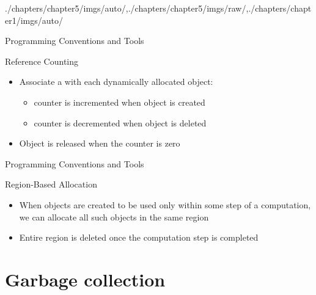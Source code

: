 \begin{graphicspathcontext}{{./chapters/chapter5/imgs/auto/},{./chapters/chapter5/imgs/raw/},{./chapters/chapter1/imgs/auto/}}
\begin{bibunit}[apalike]
\begin{frame}[t]{{Programming Conventions} and Tools \insertcontinuationtext}
	\begin{block}{Reference Counting}
		\begin{itemize}
			\item Associate a  with each dynamically allocated object: \begin{itemize}
				\item counter is incremented when object is created
				\item counter is decremented when object is deleted
			\end{itemize}
			\item Object is released when the counter is zero
		\end{itemize}
	\end{block}
	\vspace{.25cm}
\end{frame}

\begin{frame}{Programming Conventions and Tools \insertcontinuationtext}
	\begin{block}{Region-Based Allocation}
		\begin{itemize}
			\item When objects are created to be used only within some step of a computation, we can allocate all such objects in the same region
			\item Entire region is deleted once the computation step is completed
		\end{itemize}
	\end{block}
	\vspace{.25cm}
\end{frame}

\section{Garbage collection}
\sectiontableofcontentslide


\end{bibunit}
\end{graphicspathcontext}
